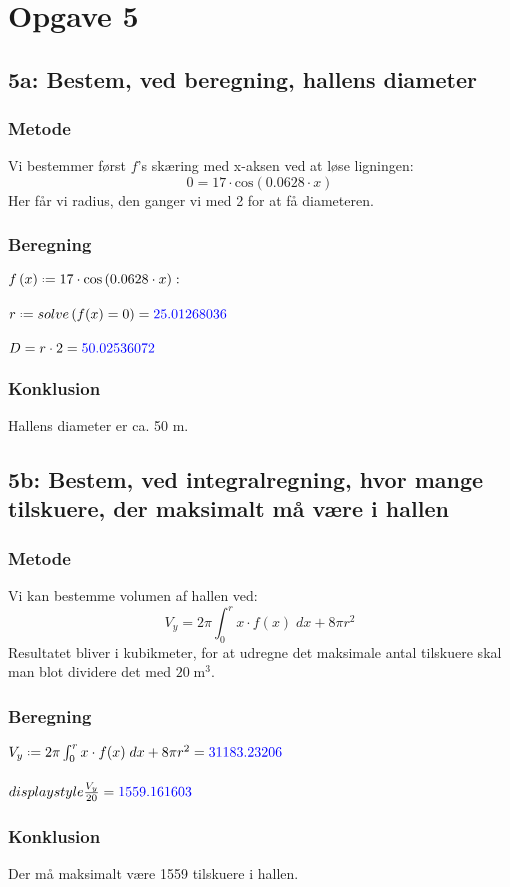 \documentclass[../main.tex]{subfiles}
\begin{document}
\section*{Opgave 5}
\subsection*{5a: Bestem, ved beregning, hallens diameter}
    \subsubsection*{Metode}
        Vi bestemmer først \(f\)'s skæring med x-aksen ved at løse ligningen:
        \[0=17\cdot \text{cos}(0.0628\cdot x)\]
        Her får vi radius, den ganger vi med 2 for at få diameteren.
    \subsubsection*{Beregning}
    \(f\left(x\right)\defeq 17\cdot \cos\left( 0.0628\cdot x\right)\colon \)\\\\
        \(r \defeq solve\left(f(x)=0\right) = \textcolor{blue}{25.01268036}\)\\\\
        \(D = r \cdot 2 = \textcolor{blue}{50.02536072}\)
    \subsubsection*{Konklusion}
        Hallens diameter er ca. 50 m.
\vspace*{1.7 cm}
\subsection*{5b: Bestem, ved integralregning, hvor mange tilskuere, der maksimalt må være i hallen}
    \subsubsection*{Metode}
        Vi kan bestemme volumen af hallen ved:
        \[V_y = 2 \pi \int _0 ^r x\cdot f(x) \; dx + 8\pi r^2\]
        Resultatet bliver i kubikmeter, for at udregne det maksimale antal tilskuere skal man blot dividere det med \(20\; \text{m}^3\).
    \subsubsection*{Beregning}
    \(V_y \defeq 2 \pi \int _0 ^r x\cdot f(x) \; dx + 8\pi r^2 = \textcolor{blue}{31183.23206}\)\\\\
    \(displaystyle \frac{V_y}{20}=\textcolor{blue}{1559.161603}\)
    \subsubsection*{Konklusion}
    Der må maksimalt være 1559 tilskuere i hallen.
\end{document}
